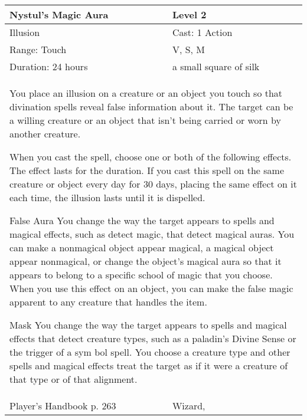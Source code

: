 \documentclass[11pt]{report}
\begin{document}
\begin{table}[H]
	\begin{tabular}{||p{6cm}|p{6cm}||}
		\hline\hline
		\bf{Nystul’s Magic Aura} & Level 2\\ \hline
		Illusion & Cast: 1 Action\\ \hline
		Range: Touch & V, S, M\\ \hline
		Duration: 24 hours & a small square of silk\\ \hline
		\multicolumn{2}{||p{12cm}||}{You place an illusion on a creature or an object you touch so that divination spells reveal false information about it.
The target can be a willing creature or an object that isn’t being carried or worn by another creature.

When you cast the spell, choose one or both of the following effects. The effect lasts for the duration. If you cast this spell on the same creature or object every day for 30 days, placing the same effect on it each time, the illusion lasts until it is dispelled. 

False Aura
You change the way the target appears to spells and magical effects, such as detect magic, that detect magical auras. You can make a nonmagical object appear magical, a magical object appear nonmagical, or change the object’s magical aura so that it appears to belong to a specific school of magic that you choose. When you use this effect on an object, you can make the false magic apparent to any creature that handles the item.

Mask
You change the way the target appears to spells and magical effects that detect creature types, such as a paladin’s Divine Sense or the trigger of a sym bol spell. You choose a creature type and other spells and magical effects treat the target as if it were a creature of that type or of that alignment.}\\ \hline
Player's Handbook p. 263 & Wizard, \\ \hline\hline
	\end{tabular}
\end{table}
\end{document}
